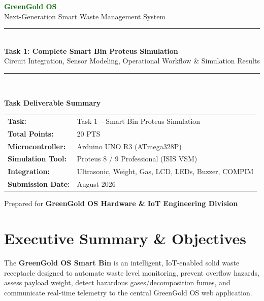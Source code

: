 \documentclass[12pt,a4paper]{article}
\begin{document}
\begin{titlepage}
\centering
\vspace*{0.8cm}

{\Huge\bfseries\textcolor{darkgreen}{GreenGold OS}}\\[0.4cm]
{\Large\textcolor{greengold}{Next-Generation Smart Waste Management System}}\\[1.8cm]

\rule{\textwidth}{2pt}\\[0.4cm]
{\LARGE\bfseries Task 1: Complete Smart Bin Proteus Simulation}\\[0.3cm]
{\large Circuit Integration, Sensor Modeling, Operational Workflow \& Simulation Results}\\[0.4cm]
\rule{\textwidth}{2pt}\\[1.8cm]

\begin{tcolorbox}[colback=green!5!white, colframe=greengold, arc=4mm, width=0.9\textwidth]
\centering
\textbf{Task Deliverable Summary}\\[0.3cm]
\begin{tabular}{ll}
\textbf{Task:}          & Task 1 -- Smart Bin Proteus Simulation \\
\textbf{Total Points:}  & 20 PTS \\
\textbf{Microcontroller:}& Arduino UNO R3 (ATmega328P) \\
\textbf{Simulation Tool:}& Proteus 8 / 9 Professional (ISIS VSM) \\
\textbf{Integration:}   & Ultrasonic, Weight, Gas, LCD, LEDs, Buzzer, COMPIM \\
\textbf{Submission Date:}& August 2026 \\
\end{tabular}
\end{tcolorbox}

\vfill
{\small Prepared for \textbf{GreenGold OS Hardware \& IoT Engineering Division}}
\end{titlepage}

\tableofcontents
\newpage

\section{Executive Summary \& Objectives}
The \textbf{GreenGold OS Smart Bin} is an intelligent, IoT-enabled solid waste receptacle designed to automate waste level monitoring, prevent overflow hazards, assess payload weight, detect hazardous gases/decomposition fumes, and communicate real-time telemetry to the central GreenGold OS web application.
\end{document}

